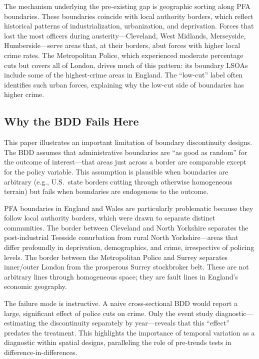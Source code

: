 \documentclass[12pt]{article}
\begin{document}
The mechanism underlying the pre-existing gap is geographic sorting along PFA boundaries. These boundaries coincide with local authority borders, which reflect historical patterns of industrialization, urbanization, and deprivation. Forces that lost the most officers during austerity---Cleveland, West Midlands, Merseyside, Humberside---serve areas that, at their borders, abut forces with higher local crime rates. The Metropolitan Police, which experienced moderate percentage cuts but covers all of London, drives much of this pattern: its boundary LSOAs include some of the highest-crime areas in England. The ``low-cut'' label often identifies such urban forces, explaining why the low-cut side of boundaries has higher crime.

\subsection{Why the BDD Fails Here}

This paper illustrates an important limitation of boundary discontinuity designs. The BDD assumes that administrative boundaries are ``as good as random'' for the outcome of interest---that areas just across a border are comparable except for the policy variable. This assumption is plausible when boundaries are arbitrary (e.g., U.S.\ state borders cutting through otherwise homogeneous terrain) but fails when boundaries are endogenous to the outcome.

PFA boundaries in England and Wales are particularly problematic because they follow local authority borders, which were drawn to separate distinct communities. The border between Cleveland and North Yorkshire separates the post-industrial Teesside conurbation from rural North Yorkshire---areas that differ profoundly in deprivation, demographics, and crime, irrespective of policing levels. The border between the Metropolitan Police and Surrey separates inner/outer London from the prosperous Surrey stockbroker belt. These are not arbitrary lines through homogeneous space; they are fault lines in England's economic geography.

The failure mode is instructive. A naive cross-sectional BDD would report a large, significant effect of police cuts on crime. Only the event study diagnostic---estimating the discontinuity separately by year---reveals that this ``effect'' predates the treatment. This highlights the importance of temporal variation as a diagnostic within spatial designs, paralleling the role of pre-trends tests in difference-in-differences.
\end{document}
